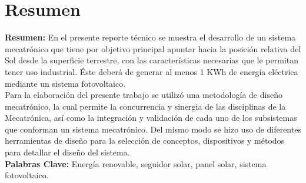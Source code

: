 \chapter{Resumen}


\textbf{Resumen:} En el presente reporte técnico se muestra el desarrollo de un sistema mecatrónico que tiene por objetivo principal apuntar hacia la posición relativa del Sol desde la superficie terrestre, con las características necesarias que le permitan tener uso industrial. Éste deberá de generar al menos 1 KWh de energía eléctrica mediante un sistema fotovoltaico.\\

Para la elaboración del presente trabajo se utilizó una metodología de diseño mecatrónico, la cual permite la concurrencia y sinergia de las disciplinas de la Mecatrónica, así como la integración y validación de cada uno de los subsistemas que conforman un sistema mecatrónico. Del mismo modo se hizo uso de diferentes herramientas de diseño para la selección de conceptos, dispositivos y métodos para detallar el diseño del sistema.\\


\textbf{Palabras Clave:} Energía renovable, seguidor solar, panel solar, sistema fotovoltaico. \\



\endinput
